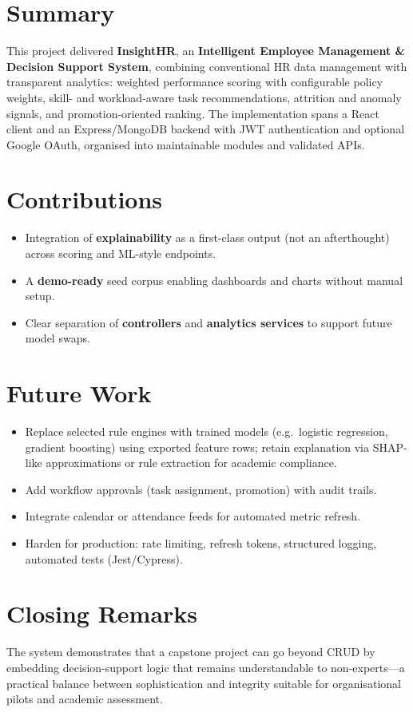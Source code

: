 \section{Summary}
This project delivered \textbf{InsightHR}, an \textbf{Intelligent Employee Management \& Decision Support System}, combining conventional HR data management with transparent analytics: weighted performance scoring with configurable policy weights, skill- and workload-aware task recommendations, attrition and anomaly signals, and promotion-oriented ranking. The implementation spans a React client and an Express/MongoDB backend with JWT authentication and optional Google OAuth, organised into maintainable modules and validated APIs.

\section{Contributions}
\begin{itemize}
  \item Integration of \textbf{explainability} as a first-class output (not an afterthought) across scoring and ML-style endpoints.
  \item A \textbf{demo-ready} seed corpus enabling dashboards and charts without manual setup.
  \item Clear separation of \textbf{controllers} and \textbf{analytics services} to support future model swaps.
\end{itemize}

\section{Future Work}
\begin{itemize}
  \item Replace selected rule engines with trained models (e.g.\ logistic regression, gradient boosting) using exported feature rows; retain explanation via SHAP-like approximations or rule extraction for academic compliance.
  \item Add workflow approvals (task assignment, promotion) with audit trails.
  \item Integrate calendar or attendance feeds for automated metric refresh.
  \item Harden for production: rate limiting, refresh tokens, structured logging, automated tests (Jest/Cypress).
\end{itemize}

\section{Closing Remarks}
The system demonstrates that a capstone project can go beyond CRUD by embedding decision-support logic that remains understandable to non-experts---a practical balance between sophistication and integrity suitable for organisational pilots and academic assessment.
